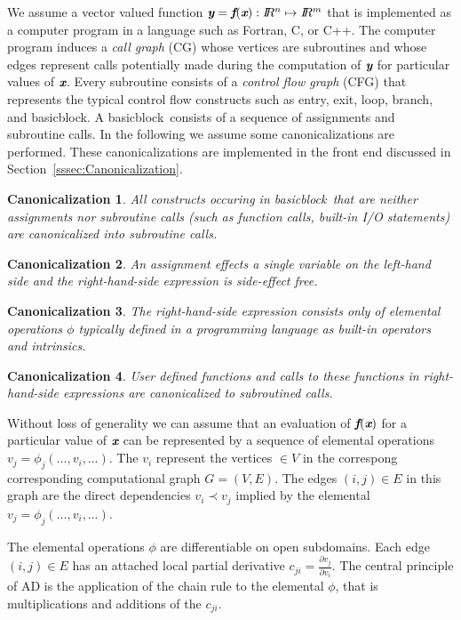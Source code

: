 \documentclass[acmtocl,acmnow]{acmtrans2m}
\newcommand{\entry}{entry}
\newcommand{\exit}{exit}
\newcommand{\Loop}{loop}
\newcommand{\branch}{branch}
\newcommand{\basicblock}{basicblock}
\newcommand{\R}{I\!\!R}
\newcommand{\bmf}{\mbox{\bf\em f}}
\newcommand{\bmx}{\mbox{\bf\em x}}
\newcommand{\bmy}{\mbox{\bf\em y}}
\newcommand{\refsec}[1]{Section~\ref{#1}}
\newtheorem{Can}{Canonicalization}
\begin{document}
We assume a vector valued function $\bmy=\bmf(\bmx): \R^n\mapsto \R^m$ that is implemented 
as a computer program in a language such as Fortran, C, or C++. 
The computer program 
induces a {\em call graph} (CG) \cite{Aho}
whose vertices are subroutines and whose edges 
represent calls potentially made during the computation of $\bmy$ for particular 
values of $\bmx$. 
Every subroutine consists of a {\em control flow graph} (CFG) that 
represents the typical control flow constructs such as \entry, \exit, \Loop, \branch, 
and \basicblock. 
A \basicblock\ consists of a sequence of assignments and subroutine calls. 
In the following we assume some canonicalizations are performed. 
These canonicalizations are implemented in the front end discussed in 
\refsec{sssec:Canonicalization}.
\begin{Can} \label{can:funcToSub}
All constructs occuring in \basicblock\ that are neither assignments nor subroutine calls (such as function calls, built-in I/O statements) 
are canonicalized into subroutine calls.
\end{Can}
\begin{Can} \label{can:assignSideEffectFree}
An assignment effects a single variable on the left-hand side and 
the right-hand-side expression is side-effect free.
\end{Can}
\begin{Can} \label{can:assignElemental}
The right-hand-side expression consists only of elemental operations $\phi$ typically 
defined in a programming language as built-in operators and intrinsics.
\end{Can}
\begin{Can} \label{can:assignFunction}
User defined functions and calls to these functions in right-hand-side expressions 
are canonicalized to subroutined calls.
\end{Can}
Without loss of generality we can assume that an evaluation of $\bmf(\bmx)$ for  
a particular value of $\bmx$ can be represented by a sequence of 
elemental operations $v_j=\phi_j(\ldots,v_i,\ldots)$. 
The $v_i$ represent the vertices $\in V$ in the correspong corresponding computational 
graph $G=(V,E)$. The edges $(i,j)\in E$ in this graph are the direct dependencies 
$v_i\prec v_j$ implied by the elemental $v_j=\phi_j(\ldots,v_i,\ldots)$.

The elemental operations $\phi$ are differentiable on open subdomains. 
Each edge $(i,j)\in E$ has an attached local partial derivative 
$c_{ji}=\frac{\partial v_j}{\partial v_i}$. 
The central principle of AD is 
the application of the chain rule to the elemental $\phi$, that is 
multiplications and additions of the  $c_{ji}$.  
\end{document}
